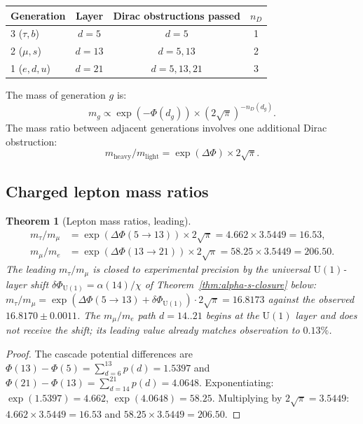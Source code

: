 \documentclass[12pt,a4paper]{article}
\newtheorem{theorem}{Theorem}[section]
\begin{document}
\begin{center}
\begin{tabular}{lccc}
\hline
Generation & Layer & Dirac obstructions passed & $n_D$ \\
\hline
3 ($\tau, b$) & $d = 5$ & $d = 5$ & 1 \\
2 ($\mu, s$) & $d = 13$ & $d = 5, 13$ & 2 \\
1 ($e, d, u$) & $d = 21$ & $d = 5, 13, 21$ & 3 \\
\hline
\end{tabular}
\end{center}

The mass of generation $g$ is:
\[
m_g \propto \exp(-\Phi(d_g)) \times (2\sqrt{\pi})^{-n_D(d_g)}.
\]
The mass ratio between adjacent generations involves one additional Dirac obstruction:
\[
m_{\text{heavy}}/m_{\text{light}} = \exp(\Delta\Phi) \times 2\sqrt{\pi}.
\]

\subsection{Charged lepton mass ratios}

\begin{theorem}[Lepton mass ratios, leading]\label{thm:lepton-ratios}
\begin{align*}
m_\tau/m_\mu &= \exp(\Delta\Phi(5 \to 13)) \times 2\sqrt{\pi} = 4.662 \times 3.5449 = 16.53, \\
m_\mu/m_e &= \exp(\Delta\Phi(13 \to 21)) \times 2\sqrt{\pi} = 58.25 \times 3.5449 = 206.50.
\end{align*}
The leading $m_\tau/m_\mu$ is closed to experimental precision by the universal $\mathrm{U}(1)$-layer shift $\delta\Phi_{\mathrm{U}(1)}=\alpha(14)/\chi$ of Theorem~\ref{thm:alpha-s-closure} below: $m_\tau/m_\mu=\exp(\Delta\Phi(5\to 13)+\delta\Phi_{\mathrm{U}(1)})\cdot 2\sqrt{\pi}=16.8173$ against the observed $16.8170\pm 0.0011$. The $m_\mu/m_e$ path $d=14..21$ begins at the $\mathrm{U}(1)$ layer and does not receive the shift; its leading value already matches observation to $0.13\%$.
\end{theorem}

\begin{proof}
The cascade potential differences are $\Phi(13) - \Phi(5) = \sum_{d=6}^{13} p(d) = 1.5397$ and $\Phi(21) - \Phi(13) = \sum_{d=14}^{21} p(d) = 4.0648$. Exponentiating: $\exp(1.5397) = 4.662$, $\exp(4.0648) = 58.25$. Multiplying by $2\sqrt{\pi} = 3.5449$: $4.662 \times 3.5449 = 16.53$ and $58.25 \times 3.5449 = 206.50$.
\end{proof}
\end{document}
